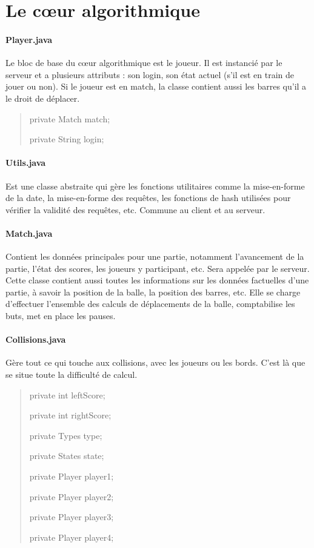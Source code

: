 \documentclass[a4paper,12pt]{report}
\begin{document}
\section{Le c\oe{}ur algorithmique}
\paragraph{Player.java}
Le bloc de base du c\oe{}ur algorithmique est le joueur. Il est instancié par le serveur et a plusieurs attributs : son login, son état actuel (s'il est en train de jouer ou non). Si le joueur est en match, la classe contient aussi les barres qu'il a le droit de déplacer.
\begin{quote}
	private Match match;
    
	private String login;
\end{quote}
\paragraph{Utils.java}
Est une classe abstraite qui gère les fonctions utilitaires comme la mise-en-forme de la date, la mise-en-forme des requêtes, les fonctions de hash utilisées pour vérifier la validité des requêtes, etc. Commune au client et au serveur.
\paragraph{Match.java}
Contient les données principales pour une partie, notamment l'avancement de la partie, l'état des scores, les joueurs y participant, etc. Sera appelée par le serveur. Cette classe contient aussi toutes les informations sur les données factuelles d'une partie, à savoir la position de la balle, la position des barres, etc. Elle se charge d'effectuer l'ensemble des calculs de déplacements de la balle, comptabilise les buts, met en place les pauses.
\paragraph{Collisions.java}
Gère tout ce qui touche aux collisions, avec les joueurs ou les bords. C'est là que se situe toute la difficulté de calcul.
\begin{quote}
    private int leftScore;
    
	private int rightScore;
	
	private Types type;
	
	private States state;
	
	private Player player1;
    
	private Player player2;
    
	private Player player3;
    
	private Player player4;
\end{quote}
\end{document}
